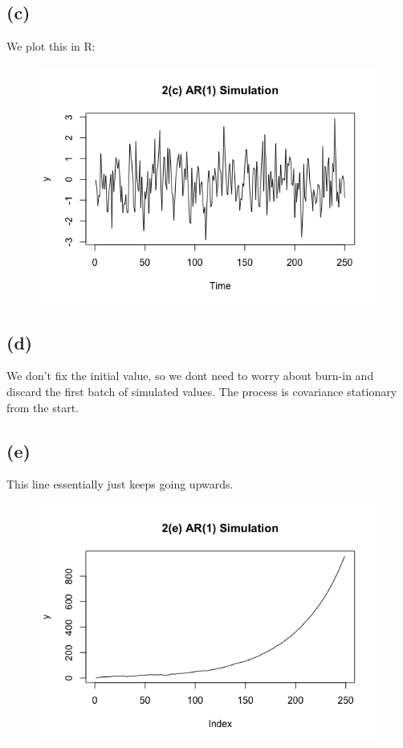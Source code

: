 \documentclass{article}
\begin{document}
{\subsection*{(c)}

We plot this in R: 
\begin{figure}[h!]
  \centering
  \includegraphics[width=500pt]{hw4_2c.png}
\end{figure}

\subsection*{(d)}

We don't fix the initial value, so we dont need to worry about burn-in and discard the first batch of simulated values. The process is covariance stationary from the start. 

\newpage

\subsection*{(e)}

This line essentially just keeps going upwards.
\begin{figure}[h]
  \centering
  \includegraphics[width=500pt]{hw4_2e.png}
\end{figure}

}
\end{document}
